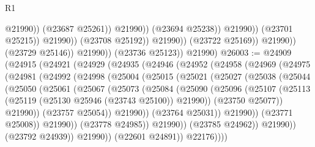 \begin{lexlean}{R1}
\begin{coremodule}
                                                @21990))
                                            (@23687 @25261))
                                          @21990))
                                      (@23694 @25238))
                                    @21990))
                                (@23701 @25215))
                              @21990))
                          (@23708 @25192))
                        @21990))
                    (@23722 @25169))
                  @21990))
              (@23729 @25146))
            @21990))
        (@23736 @25123))
      @21990)
@26003 := @24909
    (@24915
      (@24921
        (@24929
          (@24935
            (@24946
              (@24952
                (@24958
                  (@24969
                    (@24975
                      (@24981
                        (@24992
                          (@24998
                            (@25004
                              (@25015
                                (@25021
                                  (@25027
                                    (@25038
                                      (@25044
                                        (@25050
                                          (@25061
                                            (@25067
                                              (@25073
                                                (@25084
                                                  (@25090
                                                    (@25096
                                                      (@25107
                                                        (@25113
                                                          (@25119
                                                            (@25130 @25946 (@23743 @25100))
                                                            @21990))
                                                        (@23750 @25077))
                                                      @21990))
                                                  (@23757 @25054))
                                                @21990))
                                            (@23764 @25031))
                                          @21990))
                                      (@23771 @25008))
                                    @21990))
                                (@23778 @24985))
                              @21990))
                          (@23785 @24962))
                        @21990))
                    (@23792 @24939))
                  @21990))
              (@22601 @24891))
            @22176))))

\end{coremodule}
\end{lexlean}
